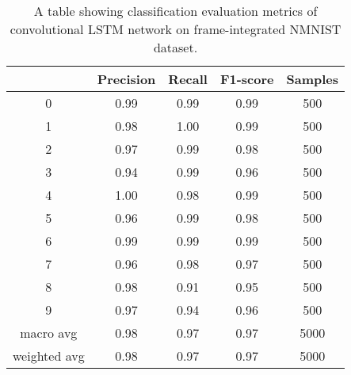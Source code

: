 \begin{table}[htb]
    \centering
    \begin{tabular}{|| c | c | c | c | c ||}
        \hline
             & Precision & Recall & F1-score & Samples \\
        \hline \hline
        0            & 0.99 & 0.99 & 0.99 & 500  \\
        \hline
        1            & 0.98 & 1.00 & 0.99 & 500  \\
        \hline
        2            & 0.97 & 0.99 & 0.98 & 500  \\
        \hline
        3            & 0.94 & 0.99 & 0.96 & 500  \\
        \hline
        4            & 1.00 & 0.98 & 0.99 & 500  \\
        \hline
        5            & 0.96 & 0.99 & 0.98 & 500  \\
        \hline
        6            & 0.99 & 0.99 & 0.99 & 500  \\
        \hline
        7            & 0.96 & 0.98 & 0.97 & 500  \\
        \hline
        8            & 0.98 & 0.91 & 0.95 & 500  \\
        \hline
        9            & 0.97 & 0.94 & 0.96 & 500  \\
        \hline
        macro avg    & 0.98 & 0.97 & 0.97 & 5000 \\
        \hline
        weighted avg & 0.98 & 0.97 & 0.97 & 5000 \\
        \hline
    \end{tabular}
    \caption{A table showing classification evaluation metrics of convolutional LSTM network on frame-integrated NMNIST dataset.}
    \label{tab:conv_lstm_nmnist_evaluation_metrics}
\end{table}

